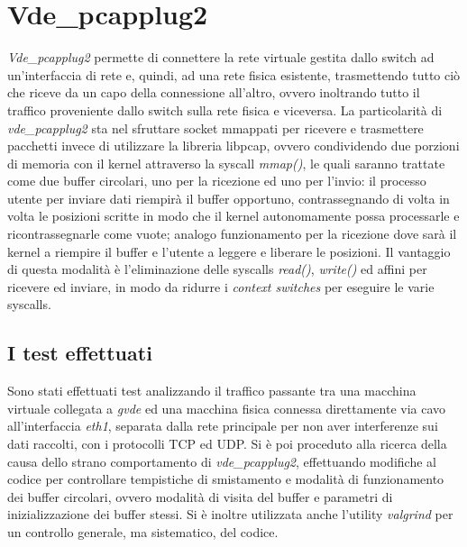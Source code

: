 \section{Vde\_pcapplug2}
{\em Vde\_pcapplug2} permette di connettere la rete virtuale gestita dallo switch ad un'interfaccia di rete e, quindi, ad una rete fisica esistente, trasmettendo tutto ciò che riceve da un capo della connessione all'altro, ovvero inoltrando tutto il traffico proveniente dallo switch sulla rete fisica e viceversa.
La particolarità di {\em vde\_pcapplug2} sta nel sfruttare socket mmappati per ricevere e trasmettere pacchetti invece di utilizzare la libreria libpcap, ovvero condividendo due porzioni di memoria con il kernel attraverso la syscall {\em mmap()}, le quali saranno trattate come due buffer circolari, uno per la ricezione ed uno per l'invio: il processo utente per inviare dati riempirà il buffer opportuno, contrassegnando di volta in volta le posizioni scritte in modo che il kernel autonomamente possa processarle e ricontrassegnarle come vuote; analogo funzionamento per la ricezione dove sarà il kernel a riempire il buffer e l'utente a leggere e liberare le posizioni. Il vantaggio di questa modalità è l'eliminazione delle syscalls {\em read()}, {\em write()} ed affini per ricevere ed inviare, in modo da ridurre i {\em context switches} per eseguire le varie syscalls.
\subsection{I test effettuati}
Sono stati effettuati test analizzando il traffico passante tra una macchina virtuale collegata a {\em gvde} ed una macchina fisica connessa direttamente via cavo all'interfaccia {\em eth1}, separata dalla rete principale per non aver interferenze sui dati raccolti, con i protocolli TCP ed UDP. Si è poi proceduto alla ricerca della causa dello strano comportamento di {\em vde\_pcapplug2}, effettuando modifiche al codice per controllare tempistiche di smistamento e modalità di funzionamento dei buffer circolari, ovvero modalità di visita del buffer e parametri di inizializzazione dei buffer stessi. Si è inoltre utilizzata anche l'utility {\em valgrind} per un controllo generale, ma sistematico, del codice.

